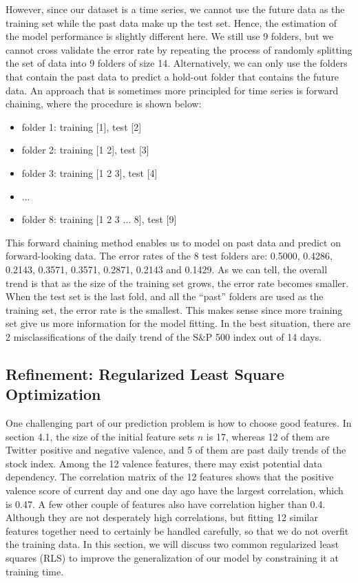 \documentclass[10pt,letterpaper]{article}
\begin{document}
 
 However, since our dataset is a time series, we cannot use the future data as the training set while the past data make up the test set. Hence, the estimation of the model performance is slightly different here. We still use 9 folders, but we cannot cross validate the error rate by repeating the process of randomly splitting the set of data into 9 folders of size 14. Alternatively, we can only use the folders that contain the past data to predict a hold-out folder that contains the future data. An approach that is sometimes more principled for time series is forward chaining, where the procedure is shown below: 

\begin{itemize}
\item folder 1: training [1], test [2]
\item folder 2: training [1 2], test [3]
\item folder 3: training [1 2 3], test [4]
\item  ...
\item folder 8: training [1 2 3 ... 8], test [9]
\end{itemize}

This forward chaining method enables us to model on past data and predict on forward-looking data. The error rates of the 8 test folders are: 0.5000, 0.4286, 0.2143, 0.3571, 0.3571, 0.2871, 0.2143 and 0.1429. As we can tell, the overall trend is that as the size of the training set grows, the error rate becomes smaller. When the test set is the last fold, and all the ``past'' folders are used as the training set, the error rate is the smallest. This makes sense since more training set give us more information for the model fitting. In the best situation, there are 2 misclassifications of the daily trend of the S\&P 500 index out of 14 days. 




\subsection{Refinement: Regularized Least Square Optimization}
One challenging part of our prediction problem is how to choose good features. In section 4.1, the size of the initial feature sets $n$ is 17, whereas 12 of them are Twitter positive and negative valence, and 5 of them are past daily trends of the stock index. Among the 12 valence features, there may exist potential data dependency. The correlation matrix of the 12 features shows that the positive valence score of current day and one day ago have the largest correlation, which is 0.47. A few other couple of features also have correlation higher than 0.4. Although they are not desperately high correlations, but fitting 12 similar features together need to certainly be handled carefully, so that we do not overfit the training data.  
In this section, we will discuss two common regularized least squares (RLS) to improve the generalization of our model by constraining it at training time.
\end{document}
